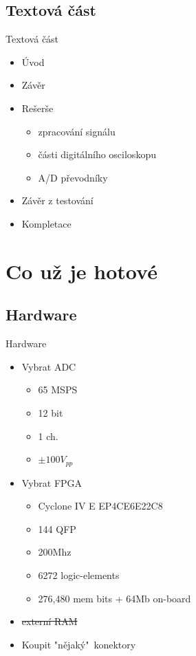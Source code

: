 \documentclass{beamer}
\begin{document}
	\subsection{Textová část}
	\begin{frame}{Textová část}
		\begin{itemize}
			\item Úvod
			\item Závěr
			\item Rešerše
			\begin{itemize}  %
				\item zpracování signálu
				\item části digitálního osciloskopu
				\item A/D převodníky
			\end{itemize}
			\item Závěr z testování
			\item Kompletace
		\end{itemize}
	\end{frame}
		
	
\section{Co už je hotové}

	\subsection{Hardware}
	\begin{frame}{Hardware}
		\begin{itemize}
			\item Vybrat ADC
				\begin{itemize}
					\item 65 MSPS
					\item 12 bit
					\item 1 ch.
					\item $ \pm 100V_{pp} $
				\end{itemize}
			\item Vybrat FPGA
				\begin{itemize}
					\item Cyclone IV E EP4CE6E22C8
					\item 144 QFP
					\item 200Mhz
					\item 6272 logic-elements
					\item 276,480 mem bits + 64Mb on-board
				\end{itemize}			
			\item \sout{externí RAM}
			\item Koupit "nějaký"\ konektory
		\end{itemize}
	\end{frame}
\end{document}
